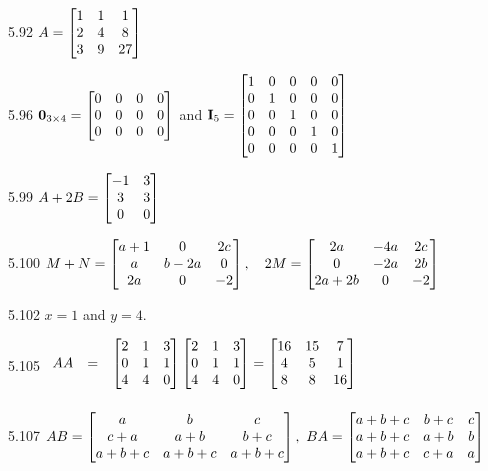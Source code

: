 \begin{Answer}{5.92}
 $A = \begin{bmatrix} 1 & 1 & 1 \cr
2 & 4 & 8 \cr 3 & 9 & 27 \cr \end{bmatrix}$
\end{Answer}
\begin{Answer}{5.96}
${\bf 0}_{3\times 4}=
\begin{bmatrix}0 & 0 & 0 & 0 \cr
0 & 0 & 0 & 0 \cr
0 & 0 & 0 & 0 \cr \end{bmatrix}$
and
 ${\bf I}_5=
\begin{bmatrix}
1 & 0 & 0 & 0 & 0\cr
0 & 1 & 0 & 0 & 0\cr
0 & 0 & 1 & 0 & 0\cr
0 & 0 & 0 & 1 & 0\cr
0 & 0 & 0 & 0 & 1\cr\end{bmatrix}$
\end{Answer}
\begin{Answer}{5.99}
$\displaystyle A + 2B = \begin{bmatrix} -1 & 3 \cr 3 & 3 \cr 0 & 0
\end{bmatrix}$
\end{Answer}
\begin{Answer}{5.100}
$M + N = \begin{bmatrix}a + 1 & 0 & 2c \cr  a &  b - 2a & 0 \cr 2a
& 0 & -2 \cr\end{bmatrix}, \ \ \ 2M = \begin{bmatrix}2a & -4a & 2c
\cr 0 & -2a & 2b \cr 2a + 2b & 0 & -2 \cr\end{bmatrix}$
\end{Answer}
\begin{Answer}{5.102}
 $x = 1$ and $y = 4$.  
\end{Answer}
\begin{Answer}{5.105}
 $\begin{array}{llll}AA & = &
\begin{bmatrix} 2 & 1 & 3 \cr
 0 & 1 & 1 \cr
  4 & 4 & 0 \cr
  \end{bmatrix}\begin{bmatrix} 2 & 1 & 3 \cr
 0 & 1 & 1 \cr
  4 & 4 & 0 \cr
  \end{bmatrix} \vspace{2mm}
   =  \begin{bmatrix} 16 & 15 & 7 \cr
 4 & 5 & 1 \cr
  8 & 8 & 16 \cr
  \end{bmatrix}
 \end{array} $
\end{Answer}
\begin{Answer}{5.107}
$AB = \begin{bmatrix} a & b & c \cr c+a & a + b & b + c
\cr a + b + c & a + b + c & a + b + c \cr
 \end{bmatrix}, \ BA = \begin{bmatrix} a + b + c & b + c & c
 \cr a + b + c & a + b & b \cr a + b + c & c + a & a \cr
\end{bmatrix}
 $
 
\end{Answer}
